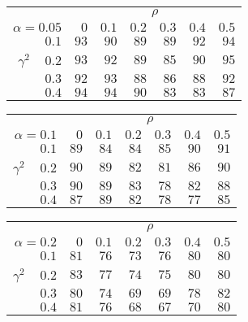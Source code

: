 \begin{tabular}{r|rrrrrr}
\hline\hline
 &\multicolumn{6}{c}{$\rho$} \\ 
 $\alpha = 0.05$ & $0$ & $0.1$ & $0.2$ & $0.3$ & $0.4$ & $0.5$ \\ 
 \hline$0.1$ & $93$ & $90$ & $89$ & $89$ & $92$ & $94$\\ 
$\gamma^2\;\;\;$ $0.2$ & $93$ & $92$ & $89$ & $85$ & $90$ & $95$\\ 
$0.3$ & $92$ & $93$ & $88$ & $86$ & $88$ & $92$\\ 
$0.4$ & $94$ & $94$ & $90$ & $83$ & $83$ & $87$\\ 
 \hline 
 \end{tabular}
 
 \vspace{2em} 
 
\begin{tabular}{r|rrrrrr}
\hline\hline
 &\multicolumn{6}{c}{$\rho$} \\ 
 $\alpha = 0.1$ & $0$ & $0.1$ & $0.2$ & $0.3$ & $0.4$ & $0.5$ \\ 
 \hline$0.1$ & $89$ & $84$ & $84$ & $85$ & $90$ & $91$\\ 
$\gamma^2\;\;\;$ $0.2$ & $90$ & $89$ & $82$ & $81$ & $86$ & $90$\\ 
$0.3$ & $90$ & $89$ & $83$ & $78$ & $82$ & $88$\\ 
$0.4$ & $87$ & $89$ & $82$ & $78$ & $77$ & $85$\\ 
 \hline 
 \end{tabular}
 
 \vspace{2em} 
 
\begin{tabular}{r|rrrrrr}
\hline\hline
 &\multicolumn{6}{c}{$\rho$} \\ 
 $\alpha = 0.2$ & $0$ & $0.1$ & $0.2$ & $0.3$ & $0.4$ & $0.5$ \\ 
 \hline$0.1$ & $81$ & $76$ & $73$ & $76$ & $80$ & $80$\\ 
$\gamma^2\;\;\;$ $0.2$ & $83$ & $77$ & $74$ & $75$ & $80$ & $80$\\ 
$0.3$ & $80$ & $74$ & $69$ & $69$ & $78$ & $82$\\ 
$0.4$ & $81$ & $76$ & $68$ & $67$ & $70$ & $80$\\ 
 \hline 
 \end{tabular}
